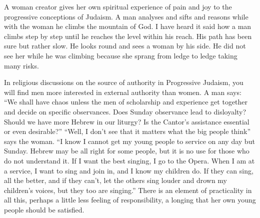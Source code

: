 \documentclass[14pt, article, extrafontsizes, twopage, a4paper]{memoir}
\begin{document}
A woman creator gives her own spiritual experience of
pain and joy to the progressive conceptions of Judaism. A
man analyses and sifts and reasons while with the woman he
climbs the mountain of God. I have heard it said how a man
climbs step by step until he reaches the level within his
reach. His path has been sure but rather slow. He looks
round and sees a woman by his side. He did not see her
while he was climbing because she sprang from ledge to
ledge taking many risks.

In religious discussions on the source of authority in
Progressive Judaism, you will find men more interested in
external authority than women. A man says: ``We shall have
chaos unless the men of scholarship and experience get
together and decide on specific observances. Does Sunday
observance lead to disloyalty? Should we have more Hebrew
in our liturgy? Is the Cantor's assistance essential or
even desirable?'' ``Well, I don't see that it matters what
the big people think'' says the woman. ``I know I cannot get
my young people to service on any day but Sunday. Hebrew
may be all right for some people, but it is no use for
those who do not understand it. If I want the best
singing, I go to the Opera. When I am at a service, I want
to sing and join in, and I know my children do. If they
can sing, all the better, and if they can't, let the others
sing louder and drown my children's voices, but they too
are singing.'' There is an element of practicality in all
this, perhaps a little less feeling of responsibility, a
longing that her own young people should be satisfied.
\end{document}
